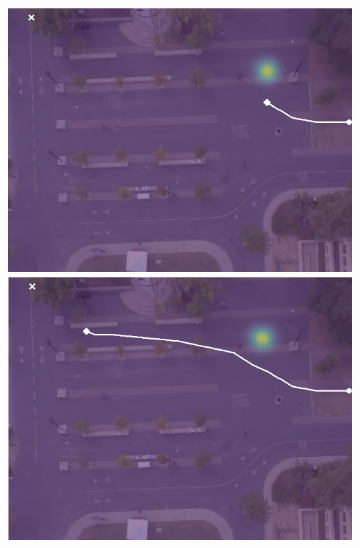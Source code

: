 \documentclass[letterpaper,10pt,conference]{ieeetran}
\begin{document}
\begin{figure}[t!]
\begin{subfigure}[t]{0.48\textwidth}
	\vspace{0.1cm}
		\begin{minipage}[c]{0.47cm}
		\end{minipage}
		\begin{minipage}[c]{0.3\linewidth}
			\includegraphics[width=\linewidth]{./figures/bookstore/lstm_1_2_t=100.jpg}
		\end{minipage}
		\begin{minipage}[c]{0.3\linewidth}
			\includegraphics[width=\linewidth]{./figures/bookstore/lstm_1_2_t=300.jpg}
		\end{minipage}
		\begin{minipage}[c]{0.3\linewidth}

\end{minipage}
\end{subfigure}
\end{figure}
\end{document}
